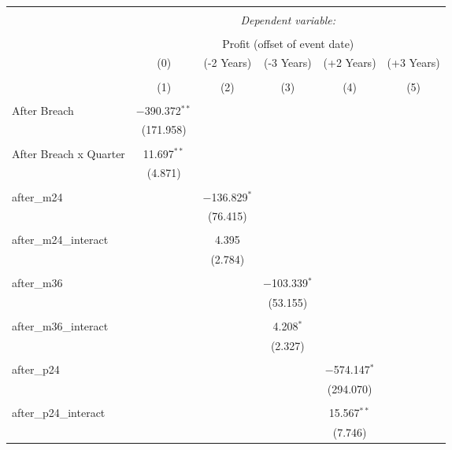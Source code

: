 
\begin{table}[!htbp] \centering 
  \caption{} 
  \label{} 
\begin{tabular}{@{\extracolsep{5pt}}lccccc} 
\\[-1.8ex]\hline 
\hline \\[-1.8ex] 
 & \multicolumn{5}{c}{\textit{Dependent variable:}} \\ 
\cline{2-6} 
\\[-1.8ex] & \multicolumn{5}{c}{Profit (offset of event date)} \\ 
 & (0) & (-2 Years) & (-3 Years) & (+2 Years) & (+3 Years) \\ 
\\[-1.8ex] & (1) & (2) & (3) & (4) & (5)\\ 
\hline \\[-1.8ex] 
 After Breach & $-$390.372$^{**}$ &  &  &  &  \\ 
  & (171.958) &  &  &  &  \\ 
  & & & & & \\ 
 After Breach x Quarter & 11.697$^{**}$ &  &  &  &  \\ 
  & (4.871) &  &  &  &  \\ 
  & & & & & \\ 
 after\_m24 &  & $-$136.829$^{*}$ &  &  &  \\ 
  &  & (76.415) &  &  &  \\ 
  & & & & & \\ 
 after\_m24\_interact &  & 4.395 &  &  &  \\ 
  &  & (2.784) &  &  &  \\ 
  & & & & & \\ 
 after\_m36 &  &  & $-$103.339$^{*}$ &  &  \\ 
  &  &  & (53.155) &  &  \\ 
  & & & & & \\ 
 after\_m36\_interact &  &  & 4.208$^{*}$ &  &  \\ 
  &  &  & (2.327) &  &  \\ 
  & & & & & \\ 
 after\_p24 &  &  &  & $-$574.147$^{*}$ &  \\ 
  &  &  &  & (294.070) &  \\ 
  & & & & & \\ 
 after\_p24\_interact &  &  &  & 15.567$^{**}$ &  \\ 
  &  &  &  & (7.746) &  \\ 

\end{tabular}
\end{table}

